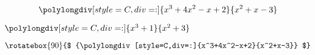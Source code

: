 \documentclass{article}
\begin{document}
\shorthandoff{-}
  \begin{equation*}
    \polylongdiv[style=C,div=:]{x^3+4x^2-x+2}{x^2+x-3}
  \end{equation*}

  $\polylongdiv[style=C,div=:]{x^3+1}{x^2+3}$

  \begin{equation*}
    \rotatebox{90}{$
      {\polylongdiv[style=C,div=:]{x^3+4x^2-x+2}{x^2+x-3}}
    $}
  \end{equation*}
\end{document}
